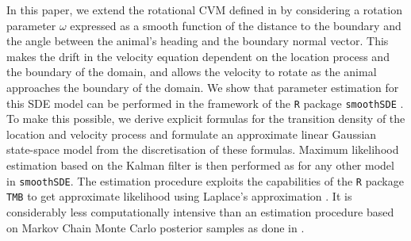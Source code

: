 \documentclass[aoas]{imsart}
\theoremstyle{definition}
\theoremstyle{remark}
\theoremstyle{remark}
\newcommand {\1}{\mathbb{1}}
\begin{document}
In this paper, we extend the rotational CVM defined in \citep{gurarie_correlated_2017} by considering a rotation parameter $\omega$ expressed as a smooth function of the distance to the boundary and the angle between the animal's heading and the boundary normal vector. This makes the drift in the velocity equation dependent on the location process and the boundary of the domain, and allows the velocity to rotate as the animal approaches the boundary of the domain. We show that parameter estimation for this SDE model can be performed in the framework of the \texttt{R} package \texttt{smoothSDE} \citep{michelot_varying-coefficient_2021}. To make this possible, we derive explicit formulas for the transition density of the location and velocity process and formulate an approximate linear Gaussian state-space model from the discretisation of these formulas. Maximum likelihood estimation based on the Kalman filter is then performed as for any other model in \texttt{smoothSDE}. The estimation procedure exploits the capabilities of the \texttt{R} package \texttt{TMB} to get approximate likelihood using Laplace's approximation \citep{kristensen_tmb_2016,albertsen_fast_2015}. It is considerably less computationally intensive than an estimation procedure based on Markov Chain Monte Carlo posterior samples as done in \citep{hanks_reflected_2017,russell_spatially_2018}.\\
\end{document}
